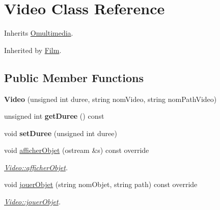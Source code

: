 \hypertarget{class_video}{\section{Video Class Reference}
\label{class_video}
}


Inherits \hyperlink{class_omultimedia}{Omultimedia}.



Inherited by \hyperlink{class_film}{Film}.

\subsection*{Public Member Functions}
\begin{DoxyCompactItemize}
\item 
\hypertarget{class_video_a5d535758640a431850f8d67773b20211}{{\bfseries Video} (unsigned int duree, string nom\+Video, string nom\+Path\+Video)}\label{class_video_a5d535758640a431850f8d67773b20211}

\item 
\hypertarget{class_video_ac9ed820535234a8c6520f68a60e72a61}{unsigned int {\bfseries get\+Duree} () const }\label{class_video_ac9ed820535234a8c6520f68a60e72a61}

\item 
\hypertarget{class_video_a8174feb6113c5b55a38b138d5be3e97b}{void {\bfseries set\+Duree} (unsigned int duree)}\label{class_video_a8174feb6113c5b55a38b138d5be3e97b}

\item 
void \hyperlink{class_video_a3a4dd11a3021cf824d98006498d0b2af}{afficher\+Objet} (ostream \&s) const override
\begin{DoxyCompactList}\small\item\em \hyperlink{class_video_a3a4dd11a3021cf824d98006498d0b2af}{Video\+::afficher\+Objet}. \end{DoxyCompactList}\item 
void \hyperlink{class_video_a62e160d1dc506f032841f2763c8e9377}{jouer\+Objet} (string nom\+Objet, string path) const override
\begin{DoxyCompactList}\small\item\em \hyperlink{class_video_a62e160d1dc506f032841f2763c8e9377}{Video\+::jouer\+Objet}. \end{DoxyCompactList}\end{DoxyCompactItemize}


